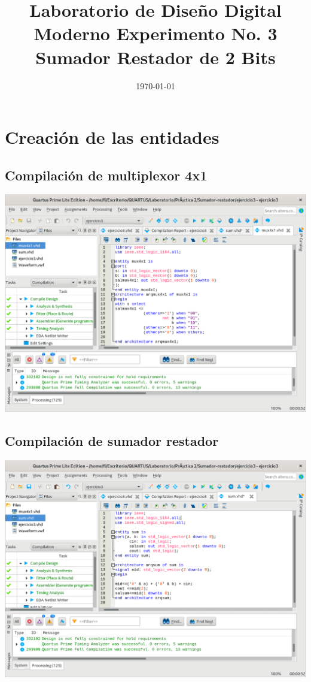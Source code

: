 \documentclass[10pt,a4paper]{article}
\title{Laboratorio de Diseño Digital Moderno Experimento No. 3 Sumador Restador de 2 Bits}
\author{}
\date{\today}
\begin{document}
	\maketitle
	
	\section{Creación de las entidades}
	\subsection{Compilación de multiplexor 4x1 }
	\begin{center}
		\includegraphics[scale=0.35]{Mux.png}
	\end{center}
	
	\subsection{Compilación de sumador restador}
	\begin{center}
		\includegraphics[scale=0.35]{Sumador.png}
	\end{center}
	
\end{document}
